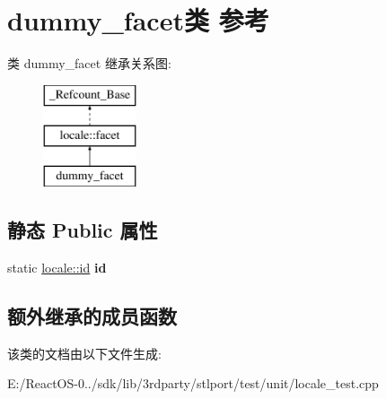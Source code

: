 \hypertarget{classdummy__facet}{}\section{dummy\+\_\+facet类 参考}
\label{classdummy__facet}
类 dummy\+\_\+facet 继承关系图\+:\begin{figure}[H]
\begin{center}
\leavevmode
\includegraphics[height=3.000000cm]{classdummy__facet}
\end{center}
\end{figure}
\subsection*{静态 Public 属性}
\begin{DoxyCompactItemize}
\item 
\mbox{\label{classdummy__facet_a025486fa15656104fea555c03da452d0}} 
static \hyperlink{classlocale_1_1id}{locale\+::id} {\bfseries id}
\end{DoxyCompactItemize}
\subsection*{额外继承的成员函数}


该类的文档由以下文件生成\+:\begin{DoxyCompactItemize}
\item 
E\+:/\+React\+O\+S-\/0../sdk/lib/3rdparty/stlport/test/unit/locale\+\_\+test.\+cpp\end{DoxyCompactItemize}
